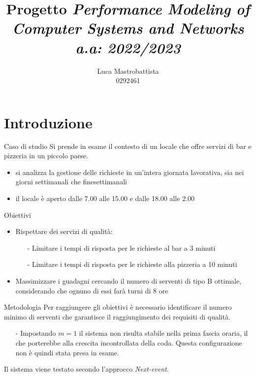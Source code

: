 \documentclass[xcolor=table]{beamer}
\begin{document}
\addtocounter{framenumber}{1}

\title{Progetto \textit{Performance Modeling of Computer Systems and Networks\\a.a: 2022/2023}}
\author{Luca Mastrobattista\\0292461}
\date{}
\begin{frame}[c,noframenumbering]
\titlepage


\end{frame}

\section{Introduzione}
\begin{frame}{Caso di studio}
\justifying
Si prende in esame il contesto di un locale che offre servizi di bar e pizzeria in un piccolo paese.
\begin{itemize}
\item si analizza la gestione delle richieste in un'intera giornata lavorativa, sia nei giorni settimanali che finesettimanali

\item il locale è aperto dalle 7.00 alle 15.00 e dalle 18.00 alle 2.00

\end{itemize}
\end{frame}



\begin{frame}{Obiettivi}
\begin{itemize}
\item Rispettare dei servizi di qualità:
\begin{itemize}
\item[-] Limitare i tempi di risposta per le richieste al bar a 3 minuti
\item[-] Limitare i tempi di risposta per le richieste alla pizzeria a 10 minuti
\end{itemize}

\item Massimizzare i guadagni cercando il numero di serventi di tipo B ottimale, considerando che ognuno di essi farà turni di 8 ore
\end{itemize}
\end{frame}



\begin{frame}{Metodologia}\justifying
Per raggiungere gli obiettivi è necessario identificare il numero minimo di serventi che garantisce il raggiungimento dei requisiti di qualità. 
\begin{itemize}
\item[-] Impostando $m = 1$ il sistema non risulta stabile nella prima fascia oraria, il che porterebbe alla crescita incontrollata della coda. Questa configurazione non è quindi stata presa in esame.
\end{itemize}
\bigskip

Il sistema viene testato secondo l'approcco \textit{Next-event}.
\end{frame}
\end{document}
